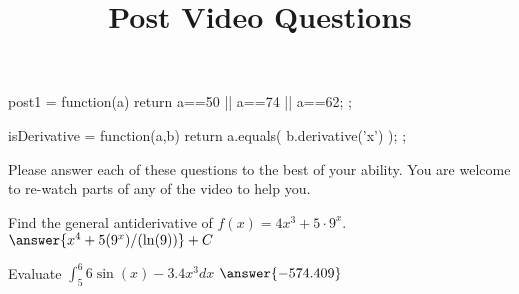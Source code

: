 \documentclass[handout]{ximera}
\title{Post Video Questions}
\begin{document}
\begin{abstract}
\end{abstract}


\maketitle

\begin{javascript}
post1 = function(a) {
    return a==50 || a==74 || a==62;
  };

isDerivative = function(a,b) {
    return a.equals( b.derivative('x') );
  };
\end{javascript}

Please answer each of these questions to the best of your ability. You are welcome to re-watch parts of any of the video to help you.

\begin{problem}
Find the general antiderivative of $f(x)=4x^3+5 \cdot 9^x$.
$\answer{x^4+ 5 (9^{x})/(\ln(9))}+C$
\end{problem}

\begin{problem}
Evaluate $\int_5^{6} 6 \sin(x) - 3.4x^{3} dx$
$\answer{-574.409}$
\end{problem}
\end{document}
